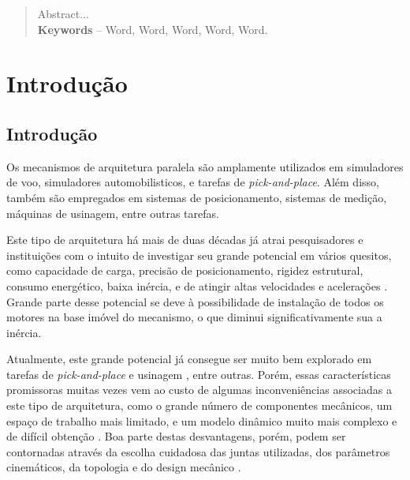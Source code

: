 \documentclass[]{politex}
\begin{document}
\begin{abstract}
Abstract...
%
\\[3\baselineskip]
%
\textbf{Keywords} -- Word, Word, Word, Word, Word.
\end{abstract}


\listadefiguras
\listadetabelas

\sumario




\part{Introdução}
	
\chapter{Introdução}

Os mecanismos de arquitetura paralela são amplamente utilizados em simuladores de voo, simuladores automobilisticos, e tarefas de {\em pick-and-place}. Além disso, também são empregados em sistemas de posicionamento, sistemas de medição, máquinas de usinagem, entre outras tarefas. 

Este tipo de arquitetura há mais de duas décadas já atrai pesquisadores e instituições com o intuito de investigar seu grande potencial em vários quesitos, como capacidade de carga, precisão de posicionamento, rigidez estrutural, consumo energético, baixa inércia, e de atingir altas velocidades e acelerações \cite{Cheng, Khalil, Merlet2002, Pashkevich, Tsai}. Grande parte desse potencial se deve à possibilidade de instalação de todos os motores na base imóvel do mecanismo, o que diminui significativamente sua a inércia. 

Atualmente, este grande potencial já consegue ser muito bem explorado em tarefas de {\em pick-and-place} \cite{Clavel} e usinagem \cite{Pashkevich}, entre outras. Porém, essas características promissoras muitas vezes vem ao custo de algumas inconveniências associadas a este tipo de arquitetura, como o grande número de componentes mecânicos, um espaço de trabalho mais limitado, e um modelo dinâmico muito mais complexo e de difícil obtenção \cite{Rynaldo, Merlet2002}. Boa parte destas desvantagens, porém, podem ser contornadas através da escolha cuidadosa das juntas utilizadas, dos parâmetros cinemáticos, da topologia e do design mecânico \cite{Briot, Campos, Jiang, Zhan}.
\end{document}
